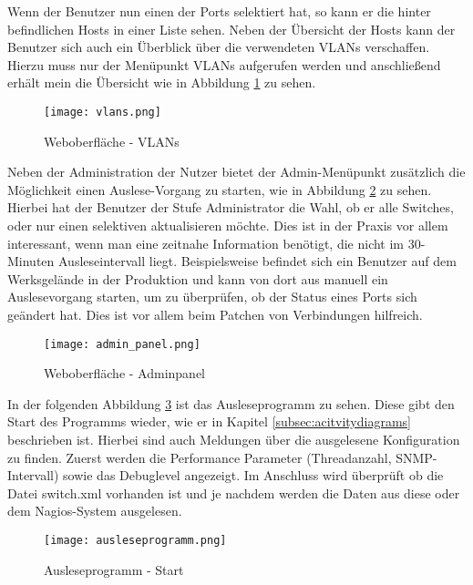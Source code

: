 Wenn der Benutzer nun einen der Ports selektiert hat, so kann er die hinter befindlichen Hosts in einer Liste sehen.
Neben der Übersicht der Hosts kann der Benutzer sich auch ein Überblick über die verwendeten VLANs verschaffen.
Hierzu muss nur der Menüpunkt VLANs aufgerufen werden und anschließend erhält mein die Übersicht wie in Abbildung \ref{fig:vlans} zu sehen.

\begin{figure}[H]
\centering
\texttt{[image: vlans.png]}
\caption[]{Weboberfläche - VLANs}
\label{fig:vlans}
\end{figure}

Neben der Administration der Nutzer bietet der Admin-Menüpunkt zusätzlich die Möglichkeit einen Auslese-Vorgang zu starten, wie in Abbildung \ref{fig:adminpanel} zu sehen.
Hierbei hat der Benutzer der Stufe Administrator die Wahl, ob er alle Switches, oder nur einen selektiven aktualisieren möchte.
Dies ist in der Praxis vor allem interessant, wenn man eine zeitnahe Information benötigt, die nicht im 30-Minuten Ausleseintervall liegt.
Beispielsweise befindet sich ein Benutzer auf dem Werksgelände in der Produktion und kann von dort aus manuell ein Auslesevorgang starten, um zu überprüfen, ob der Status eines Ports sich geändert hat.
Dies ist vor allem beim Patchen von Verbindungen hilfreich.

\begin{figure}[H]
\centering
\texttt{[image: admin\_panel.png]}
\caption[]{Weboberfläche - Adminpanel}
\label{fig:adminpanel}
\end{figure}

In der folgenden Abbildung \ref{fig:ausleseprogramm} ist das Ausleseprogramm zu sehen.
Diese gibt den Start des Programms wieder, wie er in Kapitel \ref{subsec:acitvitydiagrams} beschrieben ist.
Hierbei sind auch Meldungen über die ausgelesene Konfiguration zu finden.
Zuerst werden die Performance Parameter (Threadanzahl, SNMP-Intervall) sowie das Debuglevel angezeigt.
Im Anschluss wird überprüft ob die Datei switch.xml vorhanden ist und je nachdem werden die Daten aus diese oder dem Nagios-System ausgelesen.

\begin{figure}[H]
\centering
\texttt{[image: ausleseprogramm.png]}
\caption[]{Ausleseprogramm - Start}
\label{fig:ausleseprogramm}
\end{figure}








